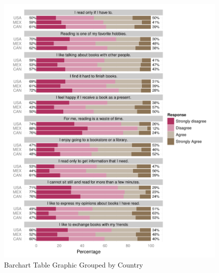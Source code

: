 \documentclass[letterpaper,11pt]{article}
\begin{document}
\begin{figure}
\begin{center}
\includegraphics{irutils-PISAItem28BarchartTable2}
\caption{Barchart Table Graphic Grouped by Country}
\label{fig:PISAItem28BarchartTable2}
\end{center}
\end{figure}




\clearpage


\end{document}
